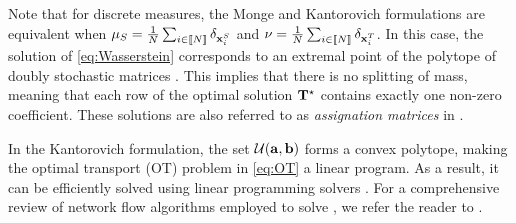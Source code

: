 Note that for discrete measures, the Monge and Kantorovich formulations are equivalent when $\mu_S = \frac{1}{N} \sum_{i \in {[\![N]\!]}} \delta_{{\mathbf{x}}^S_i}$ and $\nu = \frac{1}{N} \sum_{i \in {[\![N]\!]}} \delta_{{\mathbf{x}}^T_i}$. In this case, the solution of \eqref{eq:Wasserstein} corresponds to an extremal point of the polytope of doubly stochastic matrices \citep{bertsimas1997introduction}. This implies that there is no splitting of mass, meaning that each row of the optimal solution ${\mathbf{T}}^\star$ contains exactly one non-zero coefficient. These solutions are also referred to as \emph{assignation matrices} in .

In the Kantorovich formulation, the set ${\mathcal{U}}({\mathbf{a}}, {\mathbf{b}})$ forms a convex polytope, making the optimal transport (OT) problem in \eqref{eq:OT} a linear program. As a result, it can be efficiently solved using linear programming solvers \citep{dantzig2016linear}. For a comprehensive review of network flow algorithms employed to solve , we refer the reader to \citep{peyre2019computational}.

